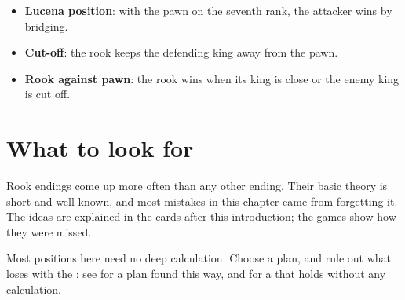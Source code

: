 \begin{itemize}
\item \textbf{Lucena position}: with the pawn on the seventh rank, the attacker wins by bridging.

\item \textbf{Cut-off}: the rook keeps the defending king away from the pawn.

\item \textbf{Rook against pawn}: the rook wins when its king is close or the enemy king is cut off.
\end{itemize}

\section*{What to look for}
Rook endings come up more often than any other ending. Their basic theory is short and well known,
and most mistakes in this chapter came from forgetting it. The ideas are explained in the cards
after this introduction; the games show how they were missed.

Most positions here need no deep calculation. Choose a plan, and rule out what loses with the
: see
 for a plan found this way, and
 for a
 that holds without any
calculation.

